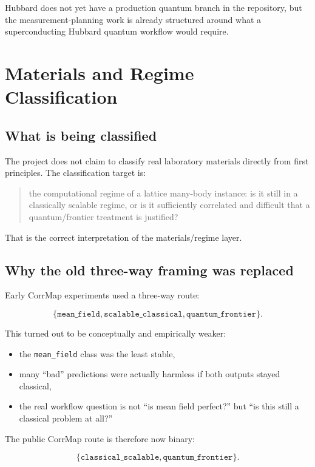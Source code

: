 \documentclass[11pt]{article}
\begin{document}
Hubbard does not yet have a production quantum branch in the repository, but the measurement-planning work is already structured around what a superconducting Hubbard quantum workflow would require.

\section{Materials and Regime Classification}

\subsection{What is being classified}

The project does not claim to classify real laboratory materials directly from first principles. The classification target is:

\begin{quote}
the computational regime of a lattice many-body instance: is it still in a classically scalable regime, or is it sufficiently correlated and difficult that a quantum/frontier treatment is justified?
\end{quote}

That is the correct interpretation of the materials/regime layer.

\subsection{Why the old three-way framing was replaced}

Early CorrMap experiments used a three-way route:

\[
\{\texttt{mean\_field},\texttt{scalable\_classical},\texttt{quantum\_frontier}\}.
\]

This turned out to be conceptually and empirically weaker:

\begin{itemize}
\item the \texttt{mean\_field} class was the least stable,
\item many ``bad'' predictions were actually harmless if both outputs stayed classical,
\item the real workflow question is not ``is mean field perfect?'' but ``is this still a classical problem at all?''
\end{itemize}

The public CorrMap route is therefore now binary:

\[
\{\texttt{classical\_scalable},\texttt{quantum\_frontier}\}.
\]
\end{document}
